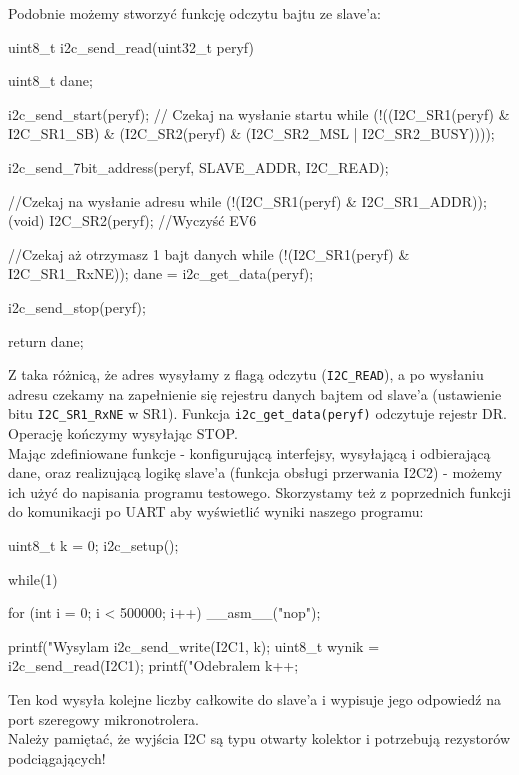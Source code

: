 

Podobnie możemy stworzyć funkcję odczytu bajtu ze slave'a:

\begin{CodeFrame*}[c]{}
uint8_t i2c_send_read(uint32_t peryf){
  uint8_t dane;
  
  i2c_send_start(peryf);
  // Czekaj na wysłanie startu
  while (!((I2C_SR1(peryf) & I2C_SR1_SB)
	   & (I2C_SR2(peryf) & (I2C_SR2_MSL | I2C_SR2_BUSY))));
  
  i2c_send_7bit_address(peryf, SLAVE_ADDR, I2C_READ);

  //Czekaj na wysłanie adresu
  while (!(I2C_SR1(peryf) & I2C_SR1_ADDR));
  (void) I2C_SR2(peryf); //Wyczyść EV6

  //Czekaj aż otrzymasz 1 bajt danych
  while (!(I2C_SR1(peryf) & I2C_SR1_RxNE));
  dane = i2c_get_data(peryf);
  
  i2c_send_stop(peryf);

  return dane;
}
\end{CodeFrame*}

Z taka różnicą, że adres wysyłamy z flagą odczytu (\Verb$I2C_READ$), a po wysłaniu adresu czekamy na zapełnienie się rejestru danych bajtem od
slave'a (ustawienie bitu \Verb$I2C_SR1_RxNE$ w SR1). Funkcja \Verb$i2c_get_data(peryf)$ odczytuje rejestr DR. Operację kończymy wysyłając STOP. \\

Mając zdefiniowane funkcje - konfigurującą interfejsy, wysyłającą i odbierającą dane, oraz realizującą logikę slave'a (funkcja obsługi przerwania
I2C2) - możemy ich użyć do napisania programu testowego. Skorzystamy też z poprzednich funkcji do komunikacji po UART aby wyświetlić wyniki naszego
programu:

\begin{CodeFrame*}[c]{}
  uint8_t k = 0;
  i2c_setup();

  while(1){
    for (int i = 0; i < 500000; i++) __asm__("nop");
    
    printf("Wysylam %
    i2c_send_write(I2C1, k);    
    uint8_t wynik = i2c_send_read(I2C1);
    printf("Odebralem %
    k++;
  }
\end{CodeFrame*}

Ten kod wysyła kolejne liczby całkowite do slave'a i wypisuje jego odpowiedź na port szeregowy mikronotrolera.\\

Należy pamiętać, że wyjścia I2C są typu otwarty kolektor i potrzebują rezystorów podciągających!
